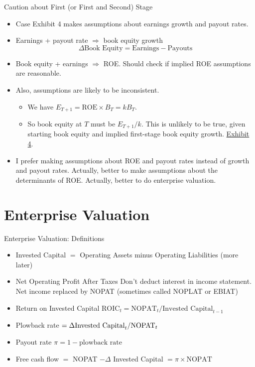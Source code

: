 \documentclass[10pt]{beamer}
\begin{document}
\begin{frame}{Caution about First (or First and Second) Stage}
    \begin{itemize}
    \item Case Exhibit 4 makes assumptions about earnings growth and payout rates.
    \item Earnings + payout rate $\Rightarrow$ book equity growth
   $$ \Delta \text{Book Equity} = \text{Earnings} - \text{Payouts} $$
    \item Book equity + earnings $\Rightarrow$ ROE.  Should check if implied ROE assumptions are reasonable.
    \item Also, assumptions are likely to be inconsistent.
    \begin{itemize}
    \item We have $E_{T+1} = \text{ROE} \times B_T = k B_T$.
    \item So book equity at $T$ must be $E_{T+1}/k$.  This is unlikely to be true, given starting book equity and implied first-stage book equity growth. \href{https://mgmt675-2025.kerryback.comassets/Walmart_Edited.xlsx}{Exhibit 4}.
    \end{itemize}
    \item I prefer making assumptions about ROE and payout rates instead of growth and payout rates.  Actually, better to make assumptions about the determinants of ROE.  Actually, better to do enterprise valuation.
  \end{itemize}
\end{frame}

\section{Enterprise Valuation}

\begin{frame}{Enterprise Valuation: Definitions}
    \begin{itemize}
        \item \alert{Invested Capital}  $=$ Operating Assets minus Operating Liabilities (more later)
        \item \alert{Net Operating Profit After Taxes} Don't deduct interest in income statement.  Net income replaced by NOPAT (sometimes called NOPLAT or EBIAT)
        \item \alert{Return on Invested Capital} $\text{ROIC}_{t} = \text{NOPAT}_{t}/\text{Invested Capital}_{t-1}$
        \item \alert{Plowback rate} $=\Delta \text{Invested Capital}_{t}/\text{\text{NOPAT}}_{t}$
        \item \alert{Payout rate}  $\pi = 1 - \text{plowback rate}$
        \item \alert{Free cash flow} $=$ NOPAT $-\Delta$ Invested Capital $= \pi \times \text{NOPAT}$
    \end{itemize}
  \end{frame}
\end{document}
